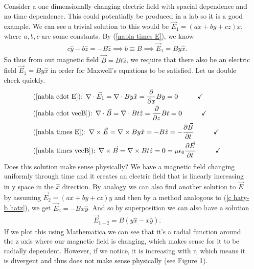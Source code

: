 \documentclass[11pt]{article}
\begin{document}
Consider a one dimensionally changing electric field with spacial dependence and no time dependence. This could potentially be produced in a lab so it is a good example. We can see a trivial solution to this would be $\vec{E}_1 = (ax+by+cz) \hat{x}$, where $a,b,c$ are some constants. By (\ref{nabla times E}), we know 
\begin{align}
c \hat{y}-b \hat{z} = -B \hat{z} \implies b \equiv B \implies \vec{E}_1 = B y\hat{x}. \label{c haty-b hatz}
\end{align}
So thus from out magnetic field $\vec{B} = Bt\hat{z}$, we require that there also be an electric field $\vec{E}_1=By \hat{x}$ in order for Maxwell's equations to be satisfied. Let us double check quickly. 
\begin{align}
&\textrm{(\ref{nabla cdot E}): }\nabla \cdot \vec{E}_1 = \nabla \cdot By \hat{x} = \frac{\partial}{\partial x} By = 0 \hspace{1cm} \checkmark \\
&\textrm{(\ref{nabla cdot vecB}): } \nabla \cdot \vec{B} = \nabla \cdot Bt \hat{z} = \frac{\partial}{\partial z} Bt = 0 \hspace{1cm} \checkmark \\
&\textrm{(\ref{nabla times E}): } \nabla \times \vec{E} = \nabla \times B y \hat{x} = -B \hat{z} = -\frac{\partial \vec{B}}{\partial t}   \hspace{1cm} \checkmark \\
&\textrm{(\ref{nabla times vecB}): } \nabla \times \vec{B} = \nabla \times Bt\hat{z} = 0 = \mu\epsilon_0\frac{\partial \vec{E}}{\partial t}\hspace{1cm} \checkmark 
\end{align}
Does this solution make sense physically? We have a magnetic field changing uniformly through time and it creates an electric field that is linearly increasing in y space in the $\hat{x}$ direction. By analogy we can also find another solution to $\vec{E}$ by assuming $\vec{E}_2 = (ax+by+cz)\hat{y}$ and then by a method analogous to (\ref{c haty-b hatz}), we get $\vec{E}_2 = -Bx\hat{y}$. And so by superposition we can also have a solution
\begin{align}
\vec{E}_{1+2} = B(y \hat{x}-x\hat{y}).
\end{align}
If we plot this using Mathematica we can see that it's a radial function around the z axis where our magnetic field is changing, which makes sense for it to be radially dependent. However, if we notice, it is increasing with r, which means it is divergent and thus does not make sense physically (see Figure 1).
\end{document}
